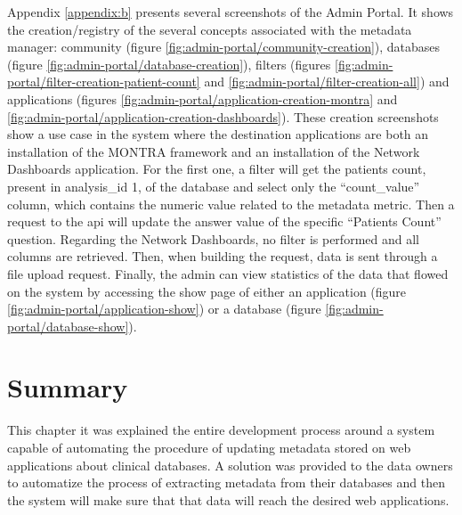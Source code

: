 Appendix \ref{appendix:b} presents several screenshots of the Admin Portal.
It shows the creation/registry of the several concepts associated with the metadata manager: community (figure \ref{fig:admin-portal/community-creation}), databases (figure \ref{fig:admin-portal/database-creation}), filters (figures \ref{fig:admin-portal/filter-creation-patient-count} and \ref{fig:admin-portal/filter-creation-all}) and applications (figures \ref{fig:admin-portal/application-creation-montra} and \ref{fig:admin-portal/application-creation-dashboards}).
These creation screenshots show a use case in the system where the destination applications are both an installation of the MONTRA framework and an installation of the Network Dashboards application.
For the first one, a filter will get the patients count, present in analysis\_id 1, of the database and select only the ``count\_value'' column, which contains the numeric value related to the metadata metric.
Then a request to the \gls{api} will update the answer value of the specific ``Patients Count'' question.
Regarding the Network Dashboards, no filter is performed and all columns are retrieved.
Then, when building the request, data is sent through a file upload request.
Finally, the admin can view statistics of the data that flowed on the system by accessing the show page of either an application (figure \ref{fig:admin-portal/application-show}) or a database (figure \ref{fig:admin-portal/database-show}).

\section{Summary}

This chapter it was explained the entire development process around a system capable of automating the procedure of updating metadata stored on web applications about clinical databases.
A solution was provided to the data owners to automatize the process of extracting metadata from their databases and then the system will make sure that that data will reach the desired web applications.

